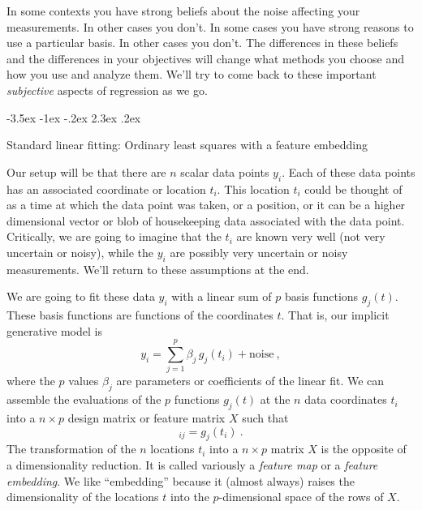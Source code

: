 \documentclass[12pt,letterpaper]{article}
\makeatletter
\renewcommand\section{\@startsection {section}{1}{\z@}%
  {-3.5ex \@plus -1ex \@minus -.2ex}%
  {2.3ex \@plus.2ex}%
  {\raggedright\normalfont\Large\bfseries}}
\makeatother
\begin{document}
In some contexts you have strong beliefs about the noise affecting your measurements. In other cases you don't.
In some cases you have strong reasons to use a particular basis.
In other cases you don't.
The differences in these beliefs and the differences in your objectives will change what methods you choose and how you use and analyze them.
We'll try to come back to these important \emph{subjective} aspects of regression as we go.

\section{Standard linear fitting: Ordinary least squares with a feature embedding}

Our setup will be that there are $n$ scalar data points $y_i$.
Each of these data points has an associated coordinate or location $t_i$.
This location $t_i$ could be thought of as a time at which the data point was taken, or a position, or it can be a higher dimensional vector or blob of housekeeping data associated with the data point.
Critically, we are going to imagine that the $t_i$ are known very well (not very uncertain or noisy), while the $y_i$ are possibly very uncertain or noisy measurements.
We'll return to these assumptions at the end.

We are going to fit these data $y_i$ with a linear sum of $p$ basis functions $g_j(t)$. These basis functions are functions of the coordinates $t$. That is, our implicit generative model is
\begin{equation}
    y_i = \sum_{j=1}^p \beta_j\,g_j(t_i) + \mathrm{noise}
    ~,
\label{eq.model}
\end{equation}
where the $p$ values $\beta_j$ are parameters or coefficients of the linear fit. We can assemble the evaluations of the $p$ functions $g_j(t)$ at the $n$ data coordinates $t_i$ into a $n\times p$ design matrix or feature matrix $X$ such that
\begin{equation}
    [X]_{ij} = g_j(t_i)
    ~.
\end{equation}
The transformation of the $n$ locations $t_i$ into a $n\times p$ matrix $X$ is the opposite of a dimensionality reduction.
It is called variously a \emph{feature map} or a \emph{feature embedding}.
We like ``embedding'' because it (almost always) raises the dimensionality of the locations $t$ into the $p$-dimensional space of the rows of $X$.
\end{document}

